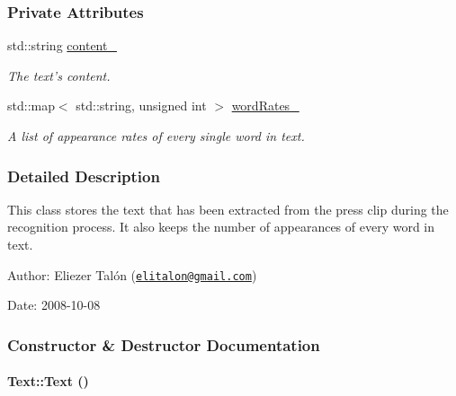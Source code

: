 \subsubsection*{Private Attributes}
\begin{CompactItemize}
\item 
\hypertarget{class_text_8c5acddb86730d41099c87da7e386f6c}{
std::string \hyperlink{class_text_8c5acddb86730d41099c87da7e386f6c}{content\_\-}}
\label{class_text_8c5acddb86730d41099c87da7e386f6c}

\begin{CompactList}\small\item\em The text's content. \item\end{CompactList}\item 
\hypertarget{class_text_5f7e6b9d9ba0dbd7c1b4070ab42f1de1}{
std::map$<$ std::string, unsigned int $>$ \hyperlink{class_text_5f7e6b9d9ba0dbd7c1b4070ab42f1de1}{wordRates\_\-}}
\label{class_text_5f7e6b9d9ba0dbd7c1b4070ab42f1de1}

\begin{CompactList}\small\item\em A list of appearance rates of every single word in text. \item\end{CompactList}\end{CompactItemize}


\subsubsection{Detailed Description}
This class stores the text that has been extracted from the press clip during the recognition process. It also keeps the number of appearances of every word in text.

\begin{Desc}
\item[Author:]Eliezer Talón (\href{mailto:elitalon@gmail.com}{\tt elitalon@gmail.com}) \end{Desc}
\begin{Desc}
\item[Date:]2008-10-08 \end{Desc}


\subsubsection{Constructor \& Destructor Documentation}
\hypertarget{class_text_b3e26143fccc52699bcc5149cae852bc}{
\paragraph[{Text}]{\setlength{\rightskip}{0pt plus 5cm}Text::Text ()}\hfill}
\label{class_text_b3e26143fccc52699bcc5149cae852bc}


